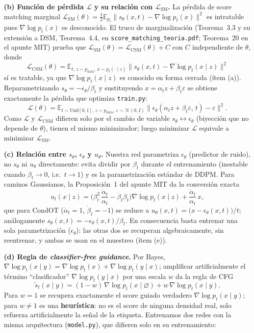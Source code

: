 \documentclass[a4paper,10pt]{article}
\theoremstyle{definition}	\newtheorem*{df}{Definici\'on}
\theoremstyle{definition}	\newtheorem{tm}{Teorema}
\theoremstyle{definition}	\newtheorem*{prop}{Proposición}
\theoremstyle{plain}		\newtheorem*{lema}{Lema}
\theoremstyle{plain}		\newtheorem*{obs}{Observaci\'on}
\theoremstyle{remark}		\newtheorem*{dem}{Demostraci\'on}
\begin{document}
\smallskip
\noindent\textbf{(b) Función de pérdida $\mathcal{L}$ y su relación con $\mathcal{L}_{\mathrm{SM}}$.}
La pérdida de score matching marginal
$\mathcal L_{\mathrm{SM}}(\theta)=\tfrac12\mathbb E_{p_t}\|s_\theta(x,t)-\nabla\log p_t(x)\|^2$
es intratable pues $\nabla\log p_t(x)$ es desconocido. El truco de
marginalización (Teorema~3.3 y su extensión a DSM, Teorema~4.4, en
\texttt{score\_matching\_teoria.pdf}; Teorema~20 en el apunte MIT) prueba
que $\mathcal L_{\mathrm{SM}}(\theta)=\mathcal L_{\mathrm{CSM}}(\theta)+C$
con $C$ independiente de $\theta$, donde
\[
\mathcal L_{\mathrm{CSM}}(\theta)=\mathbb E_{t,\,z\sim p_{\mathrm{data}},\,x\sim p_t(\cdot\mid z)}
\big\|s_\theta(x,t)-\nabla\log p_t(x\mid z)\big\|^2
\]
sí es tratable, ya que $\nabla\log p_t(x\mid z)$ es conocido en forma
cerrada (ítem (a)). Reparametrizando $s_\theta=-\epsilon_\theta/\beta_t$ y
sustituyendo $x=\alpha_t z+\beta_t\varepsilon$ se obtiene exactamente la
pérdida que optimiza \texttt{train.py}:
\[
\mathcal L(\theta)=\mathbb E_{t\sim\mathrm{Unif}[0,1],\,z\sim p_{\mathrm{data}},\,\varepsilon\sim\mathcal N(0,I)}
\big\|\epsilon_\theta(\alpha_t z+\beta_t\varepsilon,\,t)-\varepsilon\big\|^2.
\]
Como $\mathcal L$ y $\mathcal L_{\mathrm{CSM}}$ difieren solo por el cambio
de variable $s_\theta\leftrightarrow\epsilon_\theta$ (biyección que no
depende de $\theta$), tienen el mismo minimizador; luego minimizar
$\mathcal L$ equivale a minimizar $\mathcal L_{\mathrm{SM}}$.

\smallskip
\noindent\textbf{(c) Relación entre $s_\theta$, $\epsilon_\theta$ y $u_\theta$.}
Nuestra red parametriza $\epsilon_\theta$ (predictor de ruido), no
$s_\theta$ ni $u_\theta$ directamente: evita dividir por $\beta_t$ durante
el entrenamiento (inestable cuando $\beta_t\to0$, i.e.\ $t\to1$) y es la
parametrización estándar de DDPM. Para caminos Gaussianos, la
Proposición~1 del apunte MIT da la conversión exacta
\[
u_t(x\mid z)=\Big(\beta_t^2\,\frac{\dot\alpha_t}{\alpha_t}-\dot\beta_t\beta_t\Big)\nabla\log p_t(x\mid z)+\frac{\dot\alpha_t}{\alpha_t}\,x,
\]
que para CondOT ($\dot\alpha_t=1$, $\dot\beta_t=-1$) se reduce a
$u_\theta(x,t)=\big(x-\epsilon_\theta(x,t)\big)/t$; análogamente
$s_\theta(x,t)=-\epsilon_\theta(x,t)/\beta_t$. En consecuencia basta
entrenar una sola parametrización ($\epsilon_\theta$): las otras dos se
recuperan algebraicamente, sin reentrenar, y ambas se usan en el
muestreo (ítem (e)).

\smallskip
\noindent\textbf{(d) Regla de \emph{classifier-free guidance}.}
Por Bayes, $\nabla\log p_t(x\mid y)=\nabla\log p_t(x)+\nabla\log p_t(y\mid x)$;
amplificar artificialmente el término ``clasificador''
$\nabla\log p_t(y\mid x)$ por una escala $w$ da la regla de CFG
\[
\tilde s_t(x\mid y)=(1-w)\,\nabla\log p_t(x\mid\varnothing)+w\,\nabla\log p_t(x\mid y).
\]
Para $w=1$ se recupera exactamente el score guiado verdadero
$\nabla\log p_t(x\mid y)$; para $w\neq1$ es una \textbf{heurística}: no es
el score de ninguna densidad real, solo refuerza artificialmente la señal
de la etiqueta. Entrenamos dos redes con la misma arquitectura
(\texttt{model.py}), que difieren solo en su entrenamiento:
\end{document}
